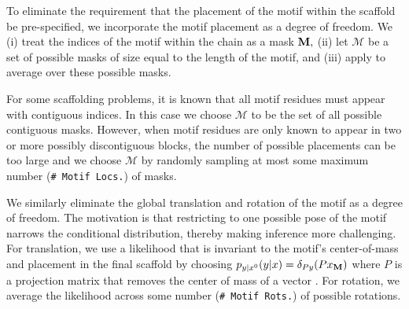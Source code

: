 To eliminate the requirement that the placement of the motif within the scaffold be pre-specified, we incorporate the motif placement as a degree of freedom.
We 
(i) treat the indices of the motif within the chain as a mask $\mathbf{M},$ 
(ii) let $\mathcal{M}$ be a set of possible masks of size equal to the length of the motif, and 
(iii) apply  to average over these possible masks.

For some scaffolding problems, it is known that all motif residues must appear with contiguous indices.
In this case we choose $\mathcal{M}$ to be the set of all possible contiguous masks.
However, when motif residues are only known to appear in two or more possibly discontiguous blocks,
the number of possible placements can be too large and we choose $\mathcal{M}$ by
randomly sampling at most some maximum number (\texttt{\# Motif Locs.}) of masks.



We similarly eliminate the global translation and rotation of the motif as a degree of freedom.
The motivation is that restricting to one possible pose of the motif narrows the conditional distribution, thereby making inference  more challenging.
For translation, we use a likelihood that is invariant to the motif's center-of-mass and placement in the final scaffold by choosing $p_{y|x^{0}}({y}|{x}) = \delta_{Py}(P x_{\mathbf{M}})$ where $P$ is a projection matrix that removes the center of mass of a vector \citep[see e.g.][section 3.3]{yim2023se}.
For rotation, we average the likelihood across some number (\texttt{\# Motif Rots.}) of possible rotations.



